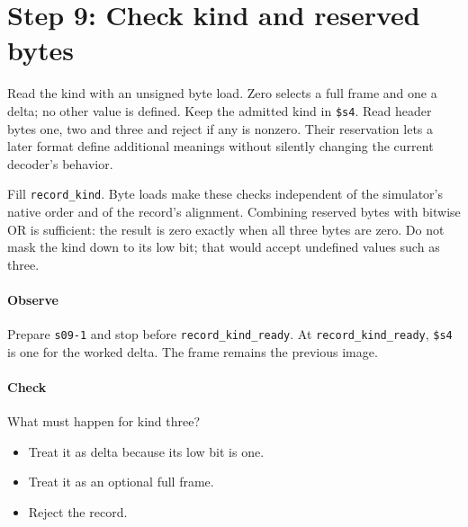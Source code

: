 \section{Step 9: Check kind and reserved bytes}
Read the kind with an unsigned byte load. Zero selects a full frame and one a
delta; no other value is defined. Keep the admitted kind in \texttt{\$s4}. Read
header bytes one, two and three and reject if any is nonzero. Their reservation
lets a later format define additional meanings without silently changing the
current decoder's behavior.

Fill \texttt{record\_kind}. Byte loads make these checks independent of the
simulator's native order and of the record's alignment. Combining reserved bytes
with bitwise OR is sufficient: the result is zero exactly when all three bytes
are zero. Do not mask the kind down to its low bit; that would accept undefined
values such as three.

\paragraph{Observe} Prepare \texttt{s09-1} and stop before
\texttt{record\_kind\_ready}. At \texttt{record\_kind\_ready}, \texttt{\$s4} is one for
the worked delta. The frame remains the previous image.

\paragraph{Check} What must happen for kind three?
\begin{itemize}
\item[A.] Treat it as delta because its low bit is one.
\item[B.] Treat it as an optional full frame.
\item[C.] Reject the record.
\end{itemize}
